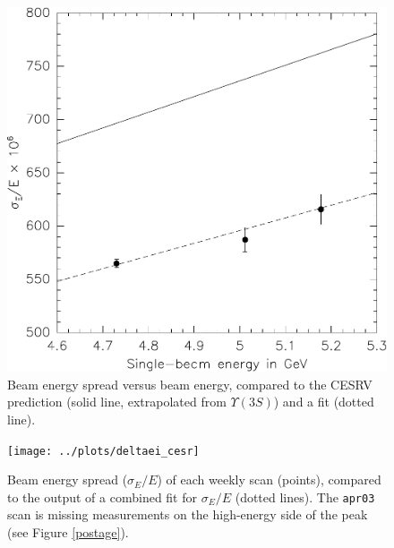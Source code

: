 \documentclass[aps,prd,preprint,superscriptaddress,tightenlines,nofootinbib,floatfix]{revtex4}
\begin{document}
\begin{figure}[p]
  \begin{center}
    \includegraphics[width=\linewidth]{beamenergyspread}
  \end{center}
  \caption{\label{beamenergyspread} Beam energy spread versus beam
  energy, compared to the CESRV prediction (solid line, extrapolated
  from $\Upsilon(3S)$) and a fit (dotted line).}
\end{figure}

\begin{figure}[p]
  \texttt{[image: ../plots/deltaei\_cesr]}
  \caption{\label{widths} Beam energy spread ($\sigma_E/E$) of each
  weekly scan (points), compared to the output of a combined fit for
  $\sigma_E/E$ (dotted lines).  The {\tt apr03} scan is missing
  measurements on the high-energy side of the peak (see Figure
  \ref{postage}).}
\end{figure}
\end{document}
